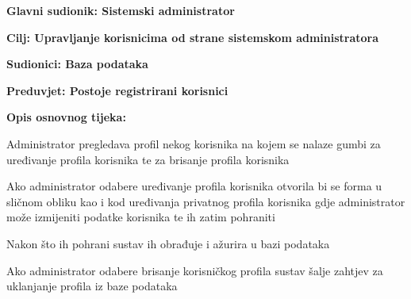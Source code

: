 				\noindent {}
				\begin{packed_item}
					
					\item \textbf{Glavni sudionik: Sistemski administrator}
					\item  \textbf{Cilj: Upravljanje korisnicima od strane sistemskom administratora} 
					\item  \textbf{Sudionici: Baza podataka} 
					\item  \textbf{Preduvjet: Postoje registrirani korisnici} 
					\item  \textbf{Opis osnovnog tijeka:}
					
					\item[] \begin{packed_enum}
						
						\item Administrator pregledava profil nekog korisnika na kojem se nalaze gumbi za uređivanje profila korisnika te za brisanje profila korisnika 
						\item Ako administrator odabere uređivanje profila korisnika otvorila bi se forma u sličnom obliku kao i kod uređivanja privatnog profila korisnika gdje administrator može izmijeniti podatke korisnika te ih zatim pohraniti
						\item Nakon što ih pohrani sustav ih obrađuje i ažurira u bazi podataka
						\item Ako administrator odabere brisanje korisničkog profila sustav šalje zahtjev za uklanjanje profila iz baze podataka

					\end{packed_enum}
					
				\end{packed_item}
				
